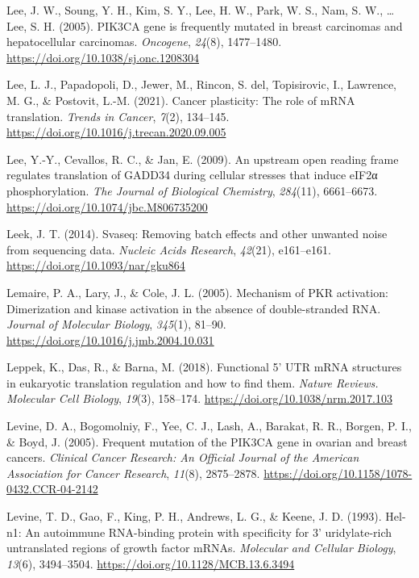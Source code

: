 \documentclass[12pt,openany]{book}
\begin{document}
\hypertarget{ref-Lee2005}{}
Lee, J. W., Soung, Y. H., Kim, S. Y., Lee, H. W., Park, W. S., Nam, S.
W., \ldots{} Lee, S. H. (2005). PIK3CA gene is frequently mutated in
breast carcinomas and hepatocellular carcinomas. \emph{Oncogene},
\emph{24}(8), 1477--1480. \url{https://doi.org/10.1038/sj.onc.1208304}

\hypertarget{ref-Lee2021}{}
Lee, L. J., Papadopoli, D., Jewer, M., Rincon, S. del, Topisirovic, I.,
Lawrence, M. G., \& Postovit, L.-M. (2021). Cancer plasticity: The role
of mRNA translation. \emph{Trends in Cancer}, \emph{7}(2), 134--145.
\url{https://doi.org/10.1016/j.trecan.2020.09.005}

\hypertarget{ref-Lee2009}{}
Lee, Y.-Y., Cevallos, R. C., \& Jan, E. (2009). An upstream open reading
frame regulates translation of GADD34 during cellular stresses that
induce eIF2α phosphorylation. \emph{The Journal of Biological
Chemistry}, \emph{284}(11), 6661--6673.
\url{https://doi.org/10.1074/jbc.M806735200}

\hypertarget{ref-Leek2014}{}
Leek, J. T. (2014). Svaseq: Removing batch effects and other unwanted
noise from sequencing data. \emph{Nucleic Acids Research},
\emph{42}(21), e161--e161. \url{https://doi.org/10.1093/nar/gku864}

\hypertarget{ref-Lemaire2005}{}
Lemaire, P. A., Lary, J., \& Cole, J. L. (2005). Mechanism of PKR
activation: Dimerization and kinase activation in the absence of
double-stranded RNA. \emph{Journal of Molecular Biology}, \emph{345}(1),
81--90. \url{https://doi.org/10.1016/j.jmb.2004.10.031}

\hypertarget{ref-Leppek2018}{}
Leppek, K., Das, R., \& Barna, M. (2018). Functional 5' UTR mRNA
structures in eukaryotic translation regulation and how to find them.
\emph{Nature Reviews. Molecular Cell Biology}, \emph{19}(3), 158--174.
\url{https://doi.org/10.1038/nrm.2017.103}

\hypertarget{ref-Levine2005}{}
Levine, D. A., Bogomolniy, F., Yee, C. J., Lash, A., Barakat, R. R.,
Borgen, P. I., \& Boyd, J. (2005). Frequent mutation of the PIK3CA gene
in ovarian and breast cancers. \emph{Clinical Cancer Research: An
Official Journal of the American Association for Cancer Research},
\emph{11}(8), 2875--2878.
\url{https://doi.org/10.1158/1078-0432.CCR-04-2142}

\hypertarget{ref-Levine1993}{}
Levine, T. D., Gao, F., King, P. H., Andrews, L. G., \& Keene, J. D.
(1993). Hel-n1: An autoimmune RNA-binding protein with specificity for
3' uridylate-rich untranslated regions of growth factor mRNAs.
\emph{Molecular and Cellular Biology}, \emph{13}(6), 3494--3504.
\url{https://doi.org/10.1128/MCB.13.6.3494}
\end{document}
